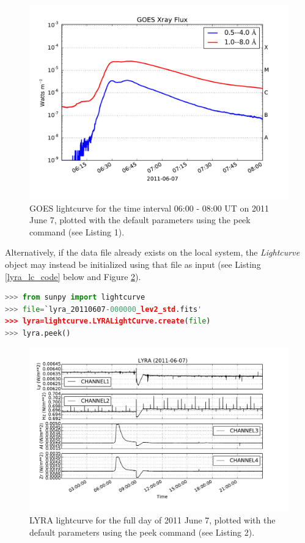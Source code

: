 \begin{figure}
\begin{center}
\includegraphics[width=14cm]{goes_lightcurve.pdf}
\caption{GOES lightcurve for the time interval 06:00 - 08:00 UT on 2011 June 7, plotted with the default parameters using the peek command (see Listing 1).}
\label{goes_lc}
\end{center}
\end{figure}

Alternatively, if the data file already exists on the local system, the \textit{Lightcurve} object may instead be initialized using that file as input (see Listing \ref{lyra_lc_code} below and Figure \ref{lyra_lc}).

\begin{lstlisting}[language=Python, caption = Creating a LYRA lightcurve using an existing data file.,label=lyra_lc_code]
>>> from sunpy import lightcurve
>>> file=`lyra_20110607-000000_lev2_std.fits'
>>> lyra=lightcurve.LYRALightCurve.create(file)
>>> lyra.peek()

\end{lstlisting}

\begin{figure}
\begin{center}
\includegraphics[width=14cm]{lyra_lightcurve.pdf}
\caption{LYRA lightcurve for the full day of 2011 June 7, plotted with the default parameters using the peek command (see Listing 2).}
\label{lyra_lc}
\end{center}
\end{figure}

